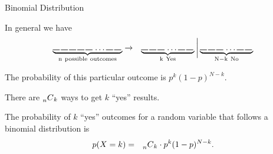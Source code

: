 \begin{frame}{Binomial Distribution}

  In general we have 
  \begin{eqnarray*}
    \underbrace{
      \rule{.3cm}{.2mm} \hspace{.05cm} 
      \rule{.3cm}{.2mm} \hspace{.05cm} 
      \rule{.3cm}{.2mm} \hspace{.05cm} 
      \rule{.3cm}{.2mm} \hspace{.05cm} 
      \rule{.3cm}{.2mm} \hspace{.05cm} \ldots
      \rule{.3cm}{.2mm} \hspace{.05cm} 
      \rule{.3cm}{.2mm} \hspace{.05cm}}_{\mathrm{n~possible~outcomes}}
    & \rightarrow & 
    \underbrace{
      \rule{.3cm}{.2mm} \hspace{.05cm} 
      \rule{.3cm}{.2mm} \hspace{.05cm} 
      \rule{.3cm}{.2mm} \hspace{.05cm} \ldots
      \rule{.3cm}{.2mm} \hspace{.05cm} 
      \rule{.3cm}{.2mm} \hspace{.05cm}}_{\mathrm{k~Yes}}
    \bigg|
    \underbrace{
      \rule{.3cm}{.2mm} \hspace{.05cm} 
      \rule{.3cm}{.2mm} \hspace{.05cm} 
      \rule{.3cm}{.2mm} \hspace{.05cm} \ldots
      \rule{.3cm}{.2mm} \hspace{.05cm} 
      \rule{.3cm}{.2mm} \hspace{.05cm}}_{\mathrm{N-k~No}}
  \end{eqnarray*}

  \vfill

  The probability of this particular outcome is $p^k(1-p)^{N-k}$. 

  \vfill

  There are $\prescript{~}{n}{C}_k$ ways to get $k$ ``yes'' results.
  
  \vfill

  \begin{definition}
    The probability of $k$ ``yes'' outcomes for a random variable that
    follows a binomial distribution is
    \begin{eqnarray*}
      p(X=k) & = & \prescript{~}{n}{C}_k \cdot p^k (1-p)^{N-k}.
    \end{eqnarray*}
  \end{definition}
  \vfill

  
\end{frame}



